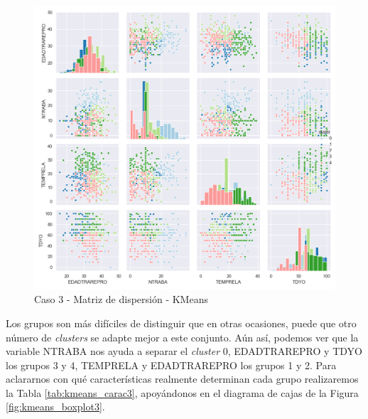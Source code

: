 \documentclass[a4paper, 20pt]{article}
\begin{document}
\begin{figure}[H]
    \centering
    \includegraphics[width=1\textwidth]{./caso3/KMeans_scattermatrix}
    \caption{Caso 3 - Matriz de dispersión - KMeans}
    \label{fig:kmeans_scattermatrix3}
\end{figure}

Los grupos son más difíciles de distinguir que en otras ocasiones, puede que otro número de \textit{clusters} se adapte mejor a este conjunto. Aún así, podemos ver que la variable NTRABA nos ayuda a separar el \textit{cluster} 0, EDADTRAREPRO y TDYO los grupos 3 y 4, TEMPRELA y EDADTRAREPRO los grupos 1 y 2. Para aclararnos con qué características realmente determinan cada grupo realizaremos la Tabla \ref{tab:kmeans_carac3}, apoyándonos en el diagrama de cajas de la Figura \ref{fig:kmeans_boxplot3}.
\end{document}
